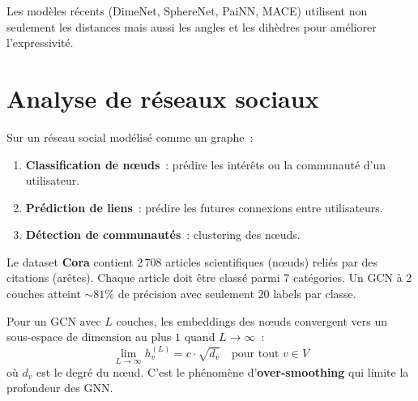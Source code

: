 \begin{remarque}
Les mod\`eles r\'ecents (DimeNet, SphereNet, PaiNN, MACE) utilisent
non seulement les distances mais aussi les angles et les dih\`edres
pour am\'eliorer l'expressivit\'e.
\end{remarque}

\section{Analyse de r\'eseaux sociaux}
\label{sec:social_networks}

\begin{definition}
Sur un r\'eseau social mod\'elis\'e comme un graphe~:
\begin{enumerate}
  \item \textbf{Classification de n\oe uds}~: pr\'edire les
        int\'er\^ets ou la communaut\'e d'un utilisateur.
  \item \textbf{Pr\'ediction de liens}~: pr\'edire les futures
        connexions entre utilisateurs.
  \item \textbf{D\'etection de communaut\'es}~: clustering des
        n\oe uds.
\end{enumerate}
\end{definition}

\begin{exemple}
Le dataset \textbf{Cora} contient 2\,708 articles
scientifiques (n\oe uds) reli\'es par des citations (ar\^etes).
Chaque article doit \^etre class\'e parmi 7 cat\'egories. Un GCN
\`a 2 couches atteint $\sim 81\%$ de pr\'ecision avec seulement
$20$ labels par classe.
\end{exemple}

\begin{proposition}
Pour un GCN avec $L$ couches, les embeddings des n\oe uds convergent
vers un sous-espace de dimension au plus $1$ quand $L \to \infty$~:
\[
  \lim_{L \to \infty} h_v^{(L)} = c \cdot \sqrt{d_v} \quad
  \text{pour tout } v \in V
\]
o\`u $d_v$ est le degr\'e du n\oe ud. C'est le ph\'enom\`ene
d'\textbf{over-smoothing} qui limite la profondeur des GNN.
\end{proposition}

